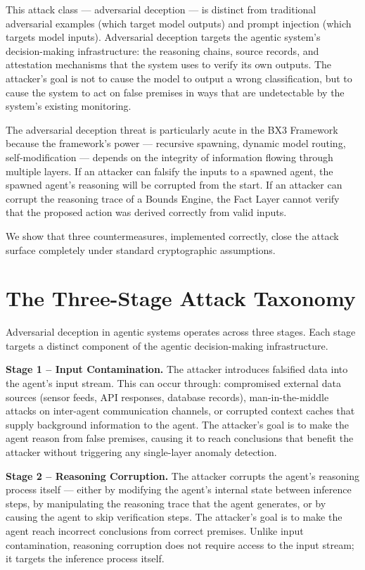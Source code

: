 \documentclass[12pt]{article}
\begin{document}
This attack class --- adversarial deception --- is distinct from traditional adversarial examples (which target model outputs) and prompt injection (which targets model inputs). Adversarial deception targets the agentic system's decision-making infrastructure: the reasoning chains, source records, and attestation mechanisms that the system uses to verify its own outputs. The attacker's goal is not to cause the model to output a wrong classification, but to cause the system to act on false premises in ways that are undetectable by the system's existing monitoring.

The adversarial deception threat is particularly acute in the BX3 Framework because the framework's power --- recursive spawning, dynamic model routing, self-modification --- depends on the integrity of information flowing through multiple layers. If an attacker can falsify the inputs to a spawned agent, the spawned agent's reasoning will be corrupted from the start. If an attacker can corrupt the reasoning trace of a Bounds Engine, the Fact Layer cannot verify that the proposed action was derived correctly from valid inputs.

We show that three countermeasures, implemented correctly, close the attack surface completely under standard cryptographic assumptions.

\section{The Three-Stage Attack Taxonomy}
\label{sec:taxonomy}

Adversarial deception in agentic systems operates across three stages. Each stage targets a distinct component of the agentic decision-making infrastructure.

\medskip\noindent\textbf{Stage 1 -- Input Contamination.}
The attacker introduces falsified data into the agent's input stream. This can occur through: compromised external data sources (sensor feeds, API responses, database records), man-in-the-middle attacks on inter-agent communication channels, or corrupted context caches that supply background information to the agent. The attacker's goal is to make the agent reason from false premises, causing it to reach conclusions that benefit the attacker without triggering any single-layer anomaly detection.

\medskip\noindent\textbf{Stage 2 -- Reasoning Corruption.}
The attacker corrupts the agent's reasoning process itself --- either by modifying the agent's internal state between inference steps, by manipulating the reasoning trace that the agent generates, or by causing the agent to skip verification steps. The attacker's goal is to make the agent reach incorrect conclusions from correct premises. Unlike input contamination, reasoning corruption does not require access to the input stream; it targets the inference process itself.
\end{document}
